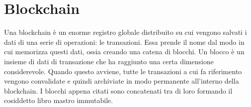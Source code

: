 \documentclass[12pt]{report}
\begin{document}
\section{Blockchain}
Una blockchain è un enorme registro globale distribuito su cui vengono salvati i dati di una serie di operazioni: le transazioni. Essa prende il nome dal modo in cui memorizza questi dati, ossia creando una catena di blocchi.\newline
Un blocco è un insieme di dati di transazione che ha raggiunto una certa dimensione considerevole. Quando questo avviene, tutte le transazioni a cui fa riferimento vengono convalidate e quindi archiviate in modo permanente all'interno della blockchain.\newline
I blocchi appena citati sono concatenati tra di loro formando il cosiddetto libro mastro immutabile. \cite{Quattro}
\end{document}
